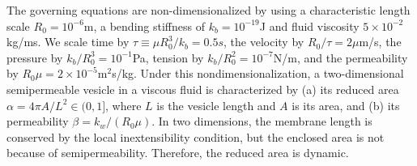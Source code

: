 \documentclass[9pt,twocolumn,twoside,lineno]{pnas-new}
\begin{document}

The governing equations are non-dimensionalized by using a 
characteristic length scale $R_0 = 10^{-6}$m, a bending stiffness of
$k_b = 10^{-19}$J and fluid viscosity $5 \times 10^{-2}$kg/ms. We scale time by $\tau\equiv\mu R_0^3/k_b = 0.5s$, 
the velocity by $R_0/\tau = 2\mu$m/s, the pressure by $k_b/R_0^3 = 10^{-1}$Pa, 
tension by $k_b/R_0^2 = 10^{-7}$N/m, and the permeability by $R_0\mu = 2 \times 10^{-5}$m$^2$s/kg. 
Under this nondimensionalization, a two-dimensional semipermeable vesicle in a viscous fluid is characterized by 
(a) its reduced area $\alpha = 4\pi A/L^2
\in (0,1]$, where $L$ is the vesicle length and $A$ is its area, and 
(b) its permeability $\beta = k_w/(R_0\mu)$.
In two dimensions, the membrane length is conserved by the local inextensibility condition, 
but the enclosed area is not because of semipermeability. Therefore, the reduced area is
dynamic.
\end{document}
